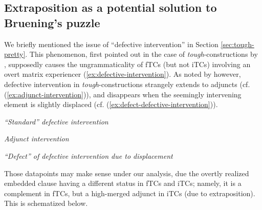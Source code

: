 \documentclass[11pt]{article}
\begin{document}
\subsection{Extraposition as a potential solution to Bruening's puzzle}
We briefly mentioned the issue of ``defective intervention'' in Section \ref{sec:tough-pretty}. This phenomenon, first pointed out in the case of \textit{tough}-constructions by \cite{Hartman2011}, supposedly causes the ungrammaticality of fTCs (but not iTCs) involving an overt matrix experiencer (\ref{ex:defective-intervention}). As noted by \cite{Bruening2014} however, defective intervention in \textit{tough}-constructions strangely extends to adjuncts (cf. (\ref{ex:adjunct-intervention})), and disappears when the seemingly intervening element is slightly displaced (cf. (\ref{ex:defect-defective-intervention})).\iffalse Moreover, as noted by \cite{Longenbaugh2015}, grammatical experiencers in fTCs behave like matrix PPs, and not like subjects of the embedded clause; which casts further doubts on the fact that ``defective intervention'' is really an intervention effect at the matrix level (\ref{ex:ftc-matrix-pp}).\fi
\begin{exe}
	\ex \textit{``Standard'' defective intervention \cite{Hartman2011}}
	\begin{xlist}
	\end{xlist}\label{ex:defective-intervention}
	\ex \textit{Adjunct intervention \cite{Bruening2014}}
	\begin{xlist}
	\end{xlist}\label{ex:adjunct-intervention}
	\ex \textit{``Defect'' of defective intervention due to displacement \cite{Bruening2014}}
	\begin{xlist}
	\end{xlist}\label{ex:defect-defective-intervention}
	\iffalse
	\ex \textit{Grammatical experiencers in fTCs are not subjects of a \textit{for}-CP}
	\begin{xlist}
		\ex[] {Cucumbers are easy for Sue to grow but they're hard for Bill (to)\footnotemark\hfill Experiencer stranding}
		\ex[] {It will be tough for Mary$_i$ PRO$_{i+j}$ to meet at that café.\hfill Partial control} 
	\end{xlist}\label{ex:ftc-matrix-pp}
	\fi
\end{exe}
Those datapoints may make sense under our analysis, due the overtly realized embedded clause having a different status in fTCs and iTCs; namely, it is a complement in fTCs, but a high-merged adjunct in iTCs (due to extraposition). This is schematized below.
\end{document}
